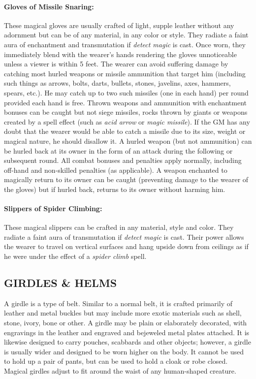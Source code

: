 \begin{multicols}{2}
\paragraph{Gloves of Missile Snaring:} These magical gloves are usually crafted of light, supple leather without any adornment but can be of any material, in any color or style.  They radiate a faint aura of enchantment and transmutation if \textit{detect magic} is cast.  Once worn, they immediately blend with the wearer's hands rendering the gloves unnoticeable unless a viewer is within 5 feet.  The wearer can avoid suffering damage by catching most hurled weapons or missile ammunition that target him (including such things as arrows, bolts, darts, bullets, stones, javelins, axes, hammers, spears, etc.).  He may catch up to two such missiles (one in each hand) per round provided each hand is free.  Thrown weapons and ammunition with enchantment bonuses can be caught but not siege missiles, rocks thrown by giants or weapons created by a spell effect (such as \textit{acid arrow} or \textit{magic missile}).  If the GM has any doubt that the wearer would be able to catch a missile due to its size, weight or magical nature, he should disallow it.  A hurled weapon (but not ammunition) can be hurled back at its owner in the form of an attack during the following or subsequent round.  All combat bonuses and penalties apply normally, including off-hand and non-skilled penalties (as applicable).  A weapon enchanted to magically return to its owner can be caught (preventing damage to the wearer of the gloves) but if hurled back, returns to its owner without harming him.

\paragraph{Slippers of Spider Climbing:} These magical slippers can be crafted in any material, style and color.  They radiate a faint aura of transmutation if \textit{detect magic} is cast.  Their power allows the wearer to travel on vertical surfaces and hang upside down from ceilings as if he were under the effect of a \textit{spider climb} spell.  

\subsection{GIRDLES \& HELMS}

A girdle is a type of belt.  Similar to a normal belt, it is crafted primarily of leather and metal buckles but may include more exotic materials such as shell, stone, ivory, bone or other.  A girdle may be plain or elaborately decorated, with engravings in the leather and engraved and bejeweled metal plates attached.  It is likewise designed to carry pouches, scabbards and other objects; however, a girdle is usually wider and designed to be worn higher on the body.  It cannot be used to hold up a pair of pants, but can be used to hold a cloak or robe closed.  Magical girdles adjust to fit around the waist of any human-shaped creature.


\end{multicols}
